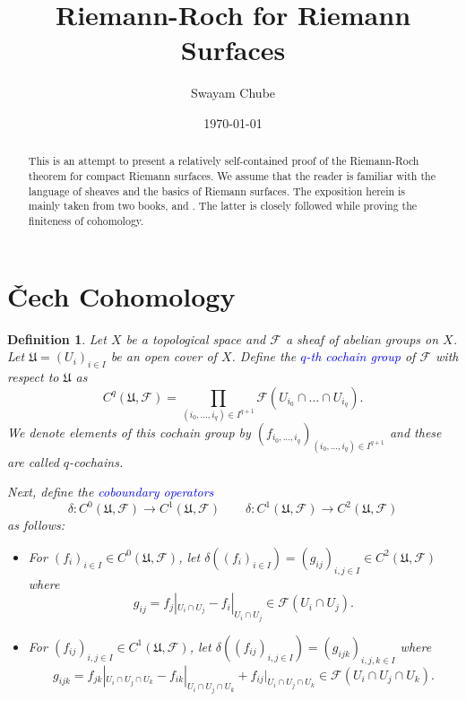 \documentclass[10pt]{article}
\title{Riemann-Roch for Riemann Surfaces}
\author{Swayam Chube}
\date{\today}
\theoremstyle{thmstyle}
\theoremstyle{defstyle}
\newtheorem{definition}[theorem]{Definition}
\newcommand{\frakU}{\mathfrak{U}}
\newcommand{\scrF}{\mathscr{F}}
\newcommand{\define}[1]{\textcolor{blue}{\textit{#1}}}
\begin{document}
\maketitle

\begin{abstract}
    This is an attempt to present a relatively self-contained proof of the Riemann-Roch theorem for compact Riemann surfaces. We assume that the reader is familiar with the language of sheaves and the basics of Riemann surfaces. The exposition herein is mainly taken from two books, \cite{forster-riemann-surfaces} and \cite{narasimhan-complex}. The latter is closely followed while proving the finiteness of cohomology.
\end{abstract}

\tableofcontents

\section{\v{C}ech Cohomology}

\begin{definition}
    Let $X$ be a topological space and $\scrF$ a sheaf of abelian groups on $X$. Let $\frakU = (U_i)_{i\in I}$ be an open cover of $X$. Define the \define{$q$-th cochain group} of $\scrF$ with respect to $\frakU$ as 
    \begin{equation*}
        C^q(\frakU,\scrF) = \prod_{(i_0,\dots,i_q)\in I^{q + 1}}\scrF(U_{i_0}\cap\dots\cap U_{i_q}).
    \end{equation*}
    We denote elements of this cochain group by $\displaystyle \left(f_{i_0,\dots,i_q}\right)_{(i_0,\dots,i_{q})\in I^{q + 1}}$ and these are called $q$-cochains.

    Next, define the \define{coboundary operators} 
    \begin{equation*}
        \delta: C^0(\frakU,\scrF)\to C^1(\frakU,\scrF)\qquad\delta: C^1(\frakU,\scrF)\to C^2(\frakU,\scrF)
    \end{equation*}
    as follows: 
    \begin{itemize}
        \item For $(f_i)_{i\in I}\in C^0(\frakU,\scrF)$, let $\delta\left((f_i)_{i\in I}\right) = (g_{ij})_{i,j\in I}\in C^2(\frakU,\scrF)$ where 
        \begin{equation*}
            g_{ij} = f_j|_{U_i\cap U_j} - f_i|_{U_i\cap U_j}\in\scrF(U_i\cap U_j).
        \end{equation*}

        \item For $(f_{ij})_{i, j\in I}\in C^1(\frakU,\scrF)$, let $\delta\left((f_{ij})_{i, j\in I}\right) = (g_{ijk})_{i, j,k\in I}$ where 
        \begin{equation*}
            g_{ijk} = f_{jk}|_{U_i\cap U_j\cap U_k} - f_{ik}|_{U_i\cap U_j\cap U_k} + f_{ij}|_{U_i\cap U_j\cap U_k}\in\scrF(U_i\cap U_j\cap U_k).
        \end{equation*}
    \end{itemize}
\end{definition}
\end{document}
